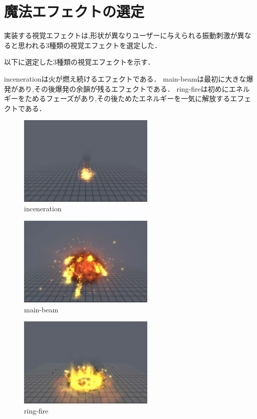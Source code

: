 \newpage

\section{魔法エフェクトの選定}
実装する視覚エフェクトは,形状が異なりユーザーに与えられる振動刺激が異なると思われる3種類の視覚エフェクトを選定した．

以下に選定した3種類の視覚エフェクトを示す．

incenerationは火が燃え続けるエフェクトである．
main-beamは最初に大きな爆発があり,その後爆発の余韻が残るエフェクトである．
ring-fireは初めにエネルギーをためるフェーズがあり,その後ためたエネルギーを一気に解放するエフェクトである．

\begin{figure}[h]
\centering
\includegraphics[clip,width=6.5cm]{./fig/firefire.png}
\caption{inceneration}\label{fire}
\end{figure}

\begin{figure}[h]
\centering
\includegraphics[clip,width=6.5cm]{./fig/explosion.png}
\caption{main-beam}\label{explosion}
\end{figure}

\begin{figure}[h]
\centering
\includegraphics[clip,width=6.5cm]{./fig/ringfire.png}
\caption{ring-fire}\label{ringfire}
\end{figure}


